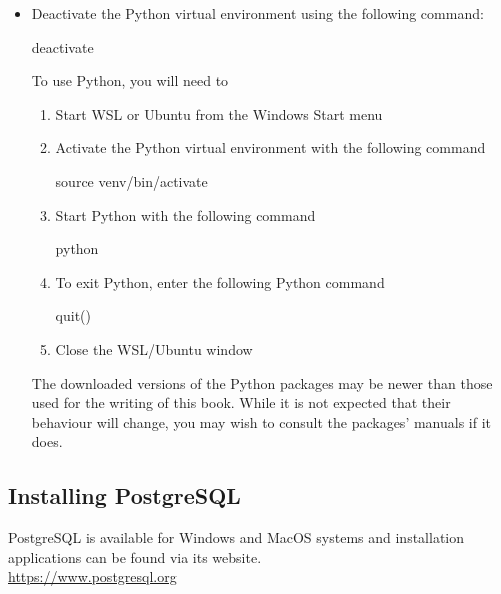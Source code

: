 \begin{itemize}
\item Deactivate the Python virtual environment using the following command:

\begin{bashcode}
deactivate
\end{bashcode}

\begin{alertbox}
To use Python, you will need to 
\begin{enumerate}
\item Start WSL or Ubuntu from the Windows Start menu
\item Activate the Python virtual environment with the following command
\begin{bashcode}
source venv/bin/activate
\end{bashcode}
\item Start Python with the following command
\begin{bashcode}
python
\end{bashcode}
\item To exit Python, enter the following Python command
\begin{pythoncode}
quit()
\end{pythoncode}
\item Close the WSL/Ubuntu window
\end{enumerate}
\end{alertbox}

\begin{infobox}
The downloaded versions of the Python packages may be newer than those used for the writing of this book. While it is not expected that their behaviour will change, you may wish to consult the packages' manuals if it does.
\end{infobox}

\end{itemize}

\clearpage
\subsection{Installing PostgreSQL}

\begin{resourcebox}
PostgreSQL is available for Windows and MacOS systems and installation applications can be found via its website. \\

\url{https://www.postgresql.org}
\end{resourcebox}

